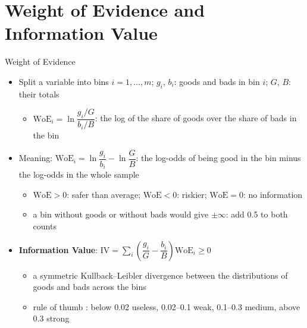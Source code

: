\section{Weight of Evidence and Information Value}

\begin{frame}{Weight of Evidence}
\itemsize{\footnotesize}
\begin{itemize}
    \item Split a variable into bins $i = 1, \dots, m$; $g_i$, $b_i$: goods and bads in bin $i$; $G$, $B$: their totals
    \begin{itemize}
        \item $\mathrm{WoE}_i = \ln\dfrac{g_i/G}{b_i/B}$: the log of the share of goods over the share of bads in the bin
    \end{itemize}
    \item Meaning: $\mathrm{WoE}_i = \ln\dfrac{g_i}{b_i} - \ln\dfrac{G}{B}$: the log-odds of being good in the bin minus the log-odds in the whole sample
    \begin{itemize}
        \item $\mathrm{WoE} > 0$: safer than average; $\mathrm{WoE} < 0$: riskier; $\mathrm{WoE} = 0$: no information
        \item a bin without goods or without bads would give $\pm\infty$: add 0.5 to both counts
    \end{itemize}
    \item \textbf{Information Value}: $\mathrm{IV} = \sum_i \left(\dfrac{g_i}{G} - \dfrac{b_i}{B}\right)\mathrm{WoE}_i \ge 0$
    \begin{itemize}
        \item a symmetric Kullback--Leibler divergence between the distributions of goods and bads across the bins
        \item rule of thumb : below 0.02 useless, 0.02--0.1 weak, 0.1--0.3 medium, above 0.3 strong
    \end{itemize}
\end{itemize}
\end{frame}

